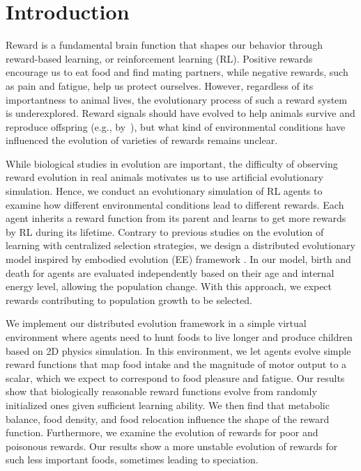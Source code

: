 \section{Introduction}\label{sec:intro}
Reward is a fundamental brain function that shapes our behavior through reward-based learning, or reinforcement learning (RL). Positive rewards encourage us to eat food and find mating partners, while negative rewards, such as pain and fatigue, help us protect ourselves. However, regardless of its importantness to animal lives, the evolutionary process of such a reward system is underexplored. Reward signals should have evolved to help animals survive and reproduce offspring (e.g., by~\cite{schultzNeuronalRewardDecision2015}), but what kind of environmental conditions have influenced the evolution of varieties of rewards remains unclear.

While biological studies in evolution are important, the difficulty of observing reward evolution in real animals motivates us to use artificial evolutionary simulation. Hence, we conduct an evolutionary simulation of RL agents to examine how different environmental conditions lead to different rewards. Each agent inherits a reward function from its parent and learns to get more rewards by RL during its lifetime. Contrary to previous studies on the evolution of learning \citep{hintonHowLearningCan1987,singhWhereRewardsCome2009} with centralized selection strategies, we design a distributed evolutionary model inspired by embodied evolution (EE) framework \citep{watsonEmbodiedEvolutionDistributing2002,bredecheEmbodiedEvolutionCollective2018}. In our model, birth and death for agents are evaluated independently based on their age and internal energy level, allowing the population change. With this approach, we expect rewards contributing to population growth to be selected.

We implement our distributed evolution framework in a simple virtual environment where agents need to hunt foods to live longer and produce children based on 2D physics simulation. In this environment, we let agents evolve simple reward functions that map food intake and the magnitude of motor output to a scalar, which we expect to correspond to food pleasure and fatigue. Our results show that biologically reasonable reward functions evolve from randomly initialized ones given sufficient learning ability. We then find that metabolic balance, food density, and food relocation influence the shape of the reward function. Furthermore, we examine the evolution of rewards for poor and poisonous rewards. Our results show a more unstable evolution of rewards for such less important foods, sometimes leading to speciation.

